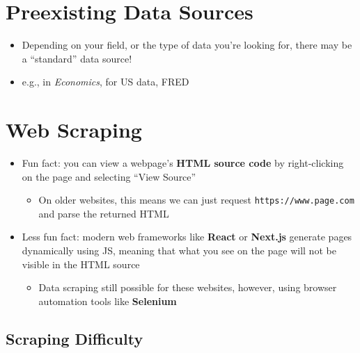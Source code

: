\documentclass[
  letterpaper,
  DIV=11,
  numbers=noendperiod,
  oneside]{scrreprt}
\providecommand{\tightlist}{%
  \setlength{\itemsep}{0pt}\setlength{\parskip}{0pt}}\usepackage{longtable,booktabs,array}
\begin{document}
\hypertarget{preexisting-data-sources}{%
\section{Preexisting Data Sources}\label{preexisting-data-sources}}

\begin{itemize}
\tightlist
\item
  Depending on your field, or the type of data you're looking for, there
  may be a ``standard'' data source!
\item
  e.g., in \emph{Economics}, for US data, FRED
\end{itemize}

\hypertarget{web-scraping}{%
\section{Web Scraping}\label{web-scraping}}

\begin{itemize}
\tightlist
\item
  Fun fact: you can view a webpage's \textbf{HTML source code} by
  right-clicking on the page and selecting ``View Source''

  \begin{itemize}
  \tightlist
  \item
    On older websites, this means we can just request
    \texttt{https://www.page.com} and parse the returned HTML
  \end{itemize}
\item
  Less fun fact: modern web frameworks like \textbf{React} or
  \textbf{Next.js} generate pages dynamically using JS, meaning that
  what you see on the page will not be visible in the HTML source

  \begin{itemize}
  \tightlist
  \item
    Data scraping still possible for these websites, however, using
    browser automation tools like \textbf{Selenium}
  \end{itemize}
\end{itemize}

\hypertarget{scraping-difficulty}{%
\subsection{Scraping Difficulty}\label{scraping-difficulty}}
\end{document}
